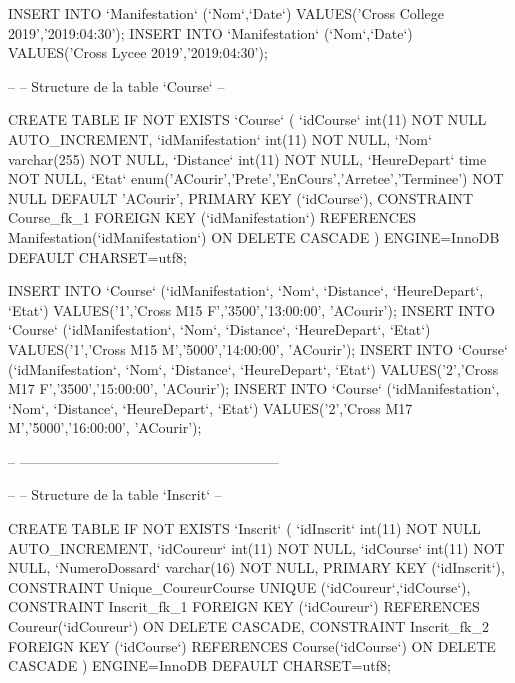 \begin{DoxyCode}
INSERT INTO `Manifestation` (`Nom`,`Date`) VALUES('Cross College 2019','2019:04:30');
INSERT INTO `Manifestation` (`Nom`,`Date`) VALUES('Cross Lycee 2019','2019:04:30');

--
-- Structure de la table `Course`
--

CREATE TABLE IF NOT EXISTS `Course` (
  `idCourse` int(11) NOT NULL AUTO\_INCREMENT,
  `idManifestation` int(11) NOT NULL,
  `Nom` varchar(255) NOT NULL,
  `Distance` int(11) NOT NULL,
  `HeureDepart` time NOT NULL,
  `Etat` enum('ACourir','Prete','EnCours','Arretee','Terminee') NOT NULL DEFAULT 'ACourir',
  PRIMARY KEY (`idCourse`),
  CONSTRAINT Course\_fk\_1 FOREIGN KEY (`idManifestation`) REFERENCES Manifestation(`idManifestation`) ON
       DELETE CASCADE
) ENGINE=InnoDB DEFAULT CHARSET=utf8;

INSERT INTO `Course` (`idManifestation`, `Nom`, `Distance`, `HeureDepart`, `Etat`) VALUES('1','Cross M15
       F','3500','13:00:00', 'ACourir');
INSERT INTO `Course` (`idManifestation`, `Nom`, `Distance`, `HeureDepart`, `Etat`) VALUES('1','Cross M15
       M','5000','14:00:00', 'ACourir');
INSERT INTO `Course` (`idManifestation`, `Nom`, `Distance`, `HeureDepart`, `Etat`) VALUES('2','Cross M17
       F','3500','15:00:00', 'ACourir');
INSERT INTO `Course` (`idManifestation`, `Nom`, `Distance`, `HeureDepart`, `Etat`) VALUES('2','Cross M17
       M','5000','16:00:00', 'ACourir');

-- --------------------------------------------------------

--
-- Structure de la table `Inscrit`
--

CREATE TABLE IF NOT EXISTS `Inscrit` (
  `idInscrit` int(11) NOT NULL AUTO\_INCREMENT,
  `idCoureur` int(11) NOT NULL,
  `idCourse` int(11) NOT NULL,
  `NumeroDossard` varchar(16) NOT NULL,
  PRIMARY KEY (`idInscrit`),
  CONSTRAINT Unique\_CoureurCourse UNIQUE (`idCoureur`,`idCourse`),
  CONSTRAINT Inscrit\_fk\_1 FOREIGN KEY (`idCoureur`) REFERENCES Coureur(`idCoureur`) ON DELETE CASCADE,
  CONSTRAINT Inscrit\_fk\_2 FOREIGN KEY (`idCourse`) REFERENCES Course(`idCourse`) ON DELETE CASCADE
) ENGINE=InnoDB DEFAULT CHARSET=utf8;


\end{DoxyCode}
